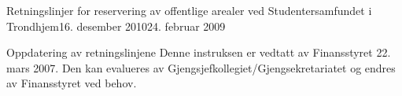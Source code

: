 \begin{instruks}{Retningslinjer for reservering av offentlige arealer
    ved Studentersamfundet i Trondhjem}{16. desember 2010}{24. februar 2009}
    \begin{instruksledd}{Oppdatering av retningslinjene}
        Denne instruksen er vedtatt av Finansstyret 22. mars 2007. Den kan evalueres
        av Gjengsjefkollegiet/Gjengsekretariatet og endres av Finansstyret ved behov.
    \end{instruksledd}

\end{instruks}



